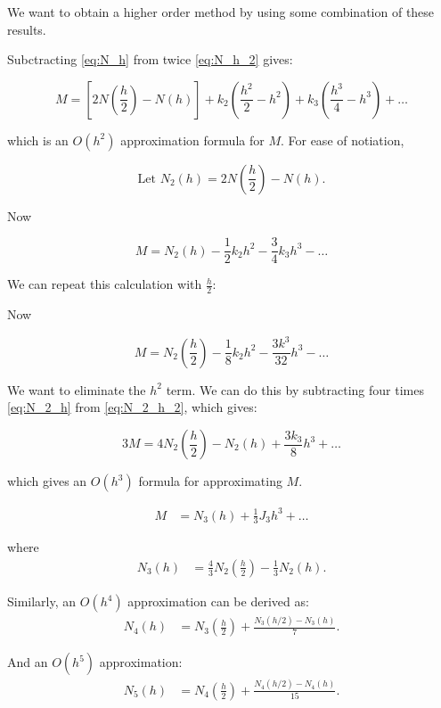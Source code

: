 We want to obtain a higher order method by using some combination of these
results. 

Subctracting \eqref{eq:N_h} from twice \eqref{eq:N_h_2} gives:

\begin{equation}
  M = [2N(\frac{h}{2}) - N(h)] + k_2(\frac{h^2}{2} - h^2) + k_3
  (\frac{h^3}{4}-h^3) + \dots
  \label{eq:2N_h_2}
\end{equation}

which is an $O(h^2)$ approximation formula for $M$. For ease of notiation, 

\[
\text{Let } N_2(h) = 2N(\frac{h}{2}) - N(h)
.\]

Now 

\begin{equation}
  M = N_2(h) - \frac{1}{2} k_2 h^2 - \frac{3}{4} k_3 h^3 - \dots
  \label{eq:N_2_h}
\end{equation}

We can repeat this calculation with $\frac{h}{2}$:

Now 

\begin{equation}
  M = N_2(\frac{h}{2}) -\frac{1}{8} k_2 h^2 - \frac{3k^3}{32}h^3 - \dots
  \label{eq:N_2_h_2}
  \end{equation}

We want to eliminate the $h^2$ term. We can do this by subtracting four times 
\eqref{eq:N_2_h} from \eqref{eq:N_2_h_2}, which gives:

\begin{equation}
  3M = 4N_2(\frac{h}{2}) -N_2(h) + \frac{3k_3}{8}h^3 + \dots
\end{equation}

which gives an $O(h^3)$ formula for approximating $M$. 

\begin{align*}
    M &= N_3(h) + \frac{1}{3} J_3 h^3 + \dots
\end{align*}

where
\begin{align*}
    N_3(h) &= \frac{4}{3} N_2 \left(\frac{h}{2}\right) - \frac{1}{3} N_2(h).
\end{align*}

Similarly, an \( O(h^4) \) approximation can be derived as:
\begin{align*}
    N_4(h) &= N_3 \left(\frac{h}{2}\right) + \frac{N_3(h/2) - N_3(h)}{7}.
\end{align*}

And an \( O(h^5) \) approximation:
\begin{align*}
    N_5(h) &= N_4 \left(\frac{h}{2}\right) + \frac{N_4(h/2) - N_4(h)}{15}.
\end{align*}

